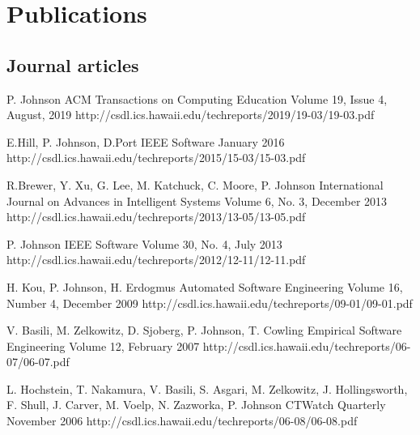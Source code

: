 \documentclass[11pt,letterpaper,sans]{moderncv} %
\begin{document}
\section{Publications}
\subsection{Journal articles}

          {P. Johnson}
          {ACM Transactions on Computing Education}
          {Volume 19, Issue 4, August, 2019}
          {http://csdl.ics.hawaii.edu/techreports/2019/19-03/19-03.pdf}

          {E.Hill,  P. Johnson, D.Port}
          {IEEE Software}
          {January 2016}
          {http://csdl.ics.hawaii.edu/techreports/2015/15-03/15-03.pdf}


          {R.Brewer, Y. Xu, G. Lee, M. Katchuck, C. Moore, P. Johnson}
          {International Journal on Advances in Intelligent Systems}
          {Volume 6, No. 3, December 2013}
          {http://csdl.ics.hawaii.edu/techreports/2013/13-05/13-05.pdf}

          {P. Johnson}
          {IEEE Software}
          {Volume 30, No. 4, July 2013}
          {http://csdl.ics.hawaii.edu/techreports/2012/12-11/12-11.pdf}

          {H. Kou, P. Johnson, H. Erdogmus}
          {Automated Software Engineering}
          {Volume 16, Number 4, December 2009}
          {http://csdl.ics.hawaii.edu/techreports/09-01/09-01.pdf}

          {V. Basili, M. Zelkowitz, D. Sjoberg, P. Johnson, T. Cowling}
          {Empirical Software Engineering}
          {Volume 12, February 2007}
          {http://csdl.ics.hawaii.edu/techreports/06-07/06-07.pdf}

          {L. Hochstein, T. Nakamura, V. Basili, S. Asgari, M. Zelkowitz, J. Hollingsworth, F. Shull, J. Carver, M. Voelp, N. Zazworka, P. Johnson}
          {CTWatch Quarterly}
          {November 2006}
          {http://csdl.ics.hawaii.edu/techreports/06-08/06-08.pdf}
\end{document}
